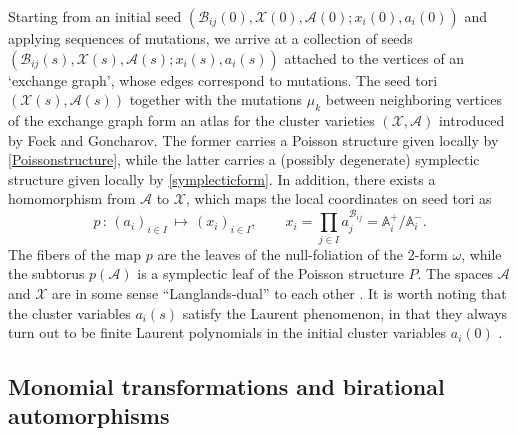 \documentclass[12pt,reqno]{article}
\numberwithin{equation}{section}
\newcommand{\be}{\begin{equation}}
\newcommand{\ee}{\end{equation}}
\newcommand{\cA}{\mathcal{A}}
\newcommand{\cX}{\mathcal{X}}
\newcommand{\exm}{\mathcal{B}}
\def\ind{s}
\numberwithin{equation}{section}
\begin{document}
Starting from an initial seed $(\exm_{ij}(0), \cX(0),\cA(0);x_i(0),a_i(0))$ and applying
sequences of mutations, we arrive at a collection of seeds $(\exm_{ij}(\ind), \cX(\ind),
\cA(\ind);x_i(\ind),a_i(\ind))$ attached to the vertices of an `exchange graph', whose edges
correspond to mutations. The seed tori $(\cX(\ind), \cA(\ind))$
together with the mutations $\mu_k$ between neighboring vertices of the exchange graph
form an atlas for the cluster varieties $(\cX,\cA)$ introduced by Fock and Goncharov. The former
carries a Poisson structure given locally by \eqref{Poissonstructure}, while the
latter carries a (possibly degenerate) symplectic structure  given locally
by \eqref{symplecticform}. In addition, there exists a homomorphism from
$\cA$ to $ \cX$, which maps the local coordinates
on seed tori as
\be
p\, :\, (a_i)_{i\in I}\, \mapsto \, (x_i)_{i\in I},
\qquad
x_i= \prod_{j\in I}a_j^{ \exm_{ij} }=\mathbb{A}_i^{+}/\mathbb{A}_i^{-}.
\ee
The fibers of the map $p$ are the leaves of the null-foliation of the 2-form $\omega$,
while the subtorus $p(\cA)$ is a symplectic leaf of the Poisson structure $P$.
The spaces $\cA$ and $\cX$ are in some sense ``Langlands-dual'' to each other \cite{FG}.
It is worth noting that the cluster variables $a_i(\ind)$
satisfy the Laurent phenomenon, in that
they always turn out to be finite Laurent polynomials in the initial cluster variables
$a_i(0)$ \cite{MR1888840}.



\subsection{Monomial transformations and birational automorphisms}
\end{document}

